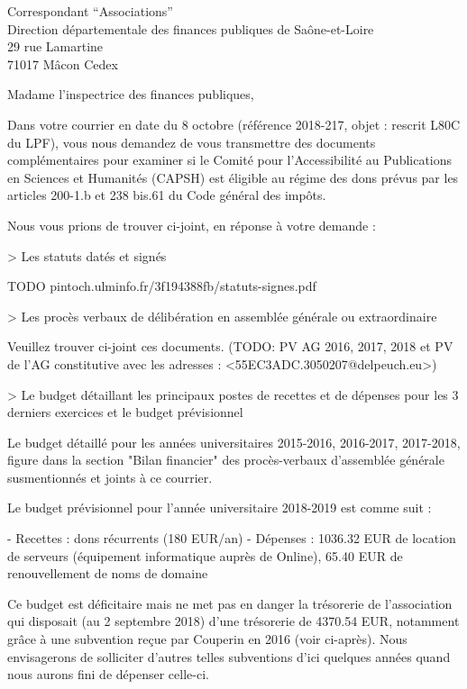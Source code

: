\documentclass[11pt]{lettre}
\makeatletter
\newcommand*{\NoRule}{\renewcommand*{\rule@length}{0}}
\makeatother
\begin{document}
\begin{letter}{Correspondant ``Associations''\\Direction départementale des finances publiques de Saône-et-Loire\\29 rue Lamartine\\71017 Mâcon Cedex}
\NoRule
{}
\signature{}
\address{Antoine Amarilli (adresse omise)}
\nofax
{}
\telephone{}
\email{}
\opening{Madame l'inspectrice des finances publiques,}

Dans votre courrier en date du 8 octobre (référence 2018-217, objet : rescrit L80C du LPF), vous nous demandez de vous transmettre des documents complémentaires pour examiner si le Comité pour l'Accessibilité au Publications en Sciences et Humanités (CAPSH) est éligible au régime des dons prévus par les articles 200-1.b et 238 bis.61 du Code général des impôts.

Nous vous prions de trouver ci-joint, en réponse à votre demande :
    
    > Les statuts datés et signés
    
TODO pintoch.ulminfo.fr/3f194388fb/statuts-signes.pdf
    
    > Les procès verbaux de délibération en assemblée générale ou extraordinaire
    
Veuillez trouver ci-joint ces documents. (TODO: PV AG 2016, 2017, 2018 et PV de l'AG constitutive avec les adresses : <55EC3ADC.3050207@delpeuch.eu>)

    > Le budget détaillant les principaux postes de recettes et de dépenses pour les 3 derniers exercices et le budget prévisionnel
    
Le budget détaillé pour les années universitaires 2015-2016, 2016-2017, 2017-2018, figure dans la section "Bilan financier" des procès-verbaux d'assemblée générale susmentionnés et joints à ce courrier.

Le budget prévisionnel pour l'année universitaire 2018-2019 est comme suit :
    
    - Recettes : dons récurrents (180 EUR/an)
    - Dépenses : 1036.32 EUR de location de serveurs (équipement informatique auprès de Online), 65.40 EUR de renouvellement de noms de domaine

Ce budget est déficitaire mais ne met pas en danger la trésorerie de l'association qui disposait (au 2 septembre 2018) d'une trésorerie de 4370.54 EUR, notamment grâce à une subvention reçue par Couperin en 2016 (voir ci-après). Nous envisagerons de solliciter d'autres telles subventions d'ici quelques années quand nous aurons fini de dépenser celle-ci.


\end{letter}
\end{document}
